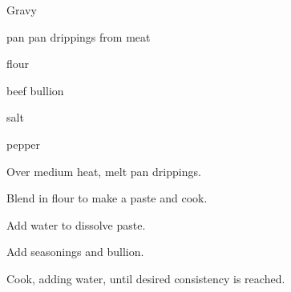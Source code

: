 \begin{recipe}{Gravy}{}{}

\begin{ingredients}
\item pan pan drippings from meat
\item {} flour
\item beef bullion
\item salt
\item pepper
\end{ingredients}

\begin{directions}
\item Over medium heat, melt pan drippings.
\item Blend in flour to make a paste and cook.
\item Add water to dissolve paste.
\item Add seasonings and bullion.
\item Cook, adding water, until desired consistency is reached.
\end{directions}

\end{recipe}
